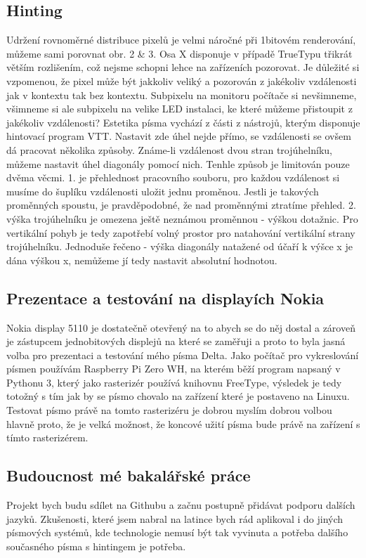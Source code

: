\documentclass[a4paper]{article}
\begin{document}
\subsection{Hinting}
Udržení rovnoměrné distribuce pixelů je velmi náročné při 1bitovém renderování, můžeme sami porovnat obr. 2 \& 3. Osa X disponuje v případě TrueTypu třikrát větším rozlišením, což nejsme schopni lehce na zařízeních pozorovat. Je důležité si vzpomenou, že pixel může být jakkoliv veliký a pozorován z jakékoliv vzdálenosti jak v kontextu tak bez kontextu. Subpixelu na monitoru počítače si nevšimneme, všimneme si ale subpixelu na velike LED instalaci, ke které můžeme přistoupit z jakékoliv vzdálenosti? Estetika písma vychází z části z nástrojů, kterým disponuje hintovací program VTT. Nastavit zde úhel nejde přímo, se vzdálenosti se ovšem dá pracovat několika způsoby. Známe-li vzdálenost dvou stran trojúhelníku, můžeme nastavit úhel diagonály pomocí nich. Tenhle způsob je limitován pouze dvěma věcmi. 1. je přehlednost pracovního souboru, pro každou vzdálenost si musíme do šuplíku vzdálenosti uložit jednu proměnou. Jestli je takových proměnných spoustu, je pravděpodobné, že nad proměnnými ztratíme přehled. 2. výška trojúhelníku je omezena ještě neznámou proměnnou - výškou dotažnic. Pro vertikální pohyb je tedy zapotřebí volný prostor pro natahování vertikální strany trojúhelníku. Jednoduše řečeno - výška diagonály natažené od účaří k výšce x je dána výškou x, nemůžeme jí tedy nastavit absolutní hodnotou.
\subsection{Prezentace a testování na displayích Nokia}
Nokia display 5110 je dostatečně otevřený na to abych se do něj dostal a zároveň je zástupcem jednobitových displejů na které se zaměřuji a proto to byla jasná volba pro prezentaci a testování mého písma Delta. Jako počítač pro vykreslování písmen používám Raspberry Pi Zero WH, na kterém běží program napsaný v Pythonu 3, který jako rasterizér používá knihovnu FreeType, výsledek je tedy totožný s tím jak by se písmo chovalo na zařízení které je postaveno na Linuxu. Testovat písmo právě na tomto rasterizéru je dobrou myslím dobrou volbou hlavně proto, že je velká možnost, že koncové užití písma bude právě na zařízení s tímto rasterizérem.
\subsection{Budoucnost mé bakalářské práce}
Projekt bych budu sdílet na Githubu a začnu postupně přidávat podporu dalších jazyků. Zkušenosti, které jsem nabral na latince bych rád aplikoval i do jiných písmových systémů, kde technologie nemusí být tak vyvinuta a potřeba dalšího současného písma s hintingem je potřeba.

\texcount 
\end{document}
